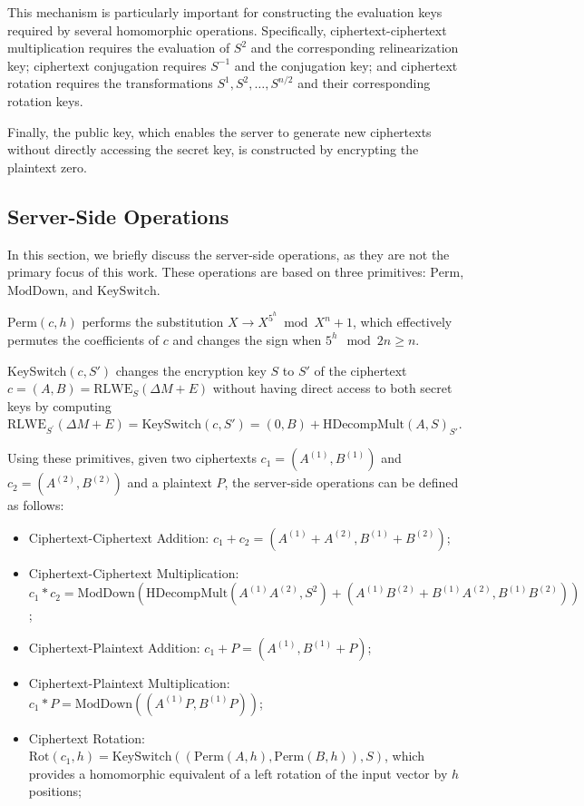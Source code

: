 This mechanism is particularly important for constructing the evaluation keys required by several homomorphic operations. Specifically, ciphertext-ciphertext multiplication requires the evaluation of $S^2$ and the corresponding relinearization key; ciphertext conjugation requires $S^{-1}$ and the conjugation key; and ciphertext rotation requires the transformations $S^1,S^2,\ldots,S^{n/2}$ and their corresponding rotation keys.

Finally, the public key, which enables the server to generate new ciphertexts without directly accessing the secret key, is constructed by encrypting the plaintext zero.

\subsection{Server-Side Operations}

In this section, we briefly discuss the server-side operations, as they are not the primary focus of this work. These operations are based on three primitives: $\text{Perm}$, $\text{ModDown}$, and $\text{KeySwitch}$.

$\text{Perm}(c, h)$ performs the substitution $X \rightarrow X^{5^h} \bmod X^n+1$, which effectively permutes the coefficients of $c$ and changes the sign when $5^h \mod 2n \geq n$.


KeySwitch$(c, S')$ changes the encryption key $S$ to $S'$ of the ciphertext $c = (A,B) = \text{RLWE}_S(\Delta M + E)$ without having direct access to both secret keys by computing $\text{RLWE}_{S^{'}}(\Delta M + E) = \text{KeySwitch}(c, S') = (0,B) + \text{HDecompMult}(A, S)_{S'}$.

Using these primitives, given two ciphertexts $c_1 = (A^{(1)}, B^{(1)})$ and $c_2 = (A^{(2)}, B^{(2)})$ and a plaintext $P$, the server-side operations can be defined as follows:

\begin{itemize}
    \item Ciphertext-Ciphertext Addition: $c_1 + c_2 = (A^{(1)} + A^{(2)}, B^{(1)} + B^{(2)})$;
    \item Ciphertext-Ciphertext Multiplication: $c_1 * c_2 = \text{ModDown}(\text{HDecompMult}(A^{(1)}A^{(2)}, S^2) + (A^{(1)}B^{(2)} + B^{(1)}A^{(2)}, B^{(1)}B^{(2)}))$;
    \item Ciphertext-Plaintext Addition: $c_1 + P = (A^{(1)}, B^{(1)} + P)$;
    \item Ciphertext-Plaintext Multiplication: $c_1 * P = \text{ModDown}((A^{(1)}P, B^{(1)}P))$;
    \item Ciphertext Rotation: $\text{Rot}(c_1, h) = \text{KeySwitch}((\text{Perm}(A, h), \text{Perm}(B, h)), S)$, which provides a homomorphic equivalent of a left rotation of the input vector by $h$ positions;
\end{itemize}

